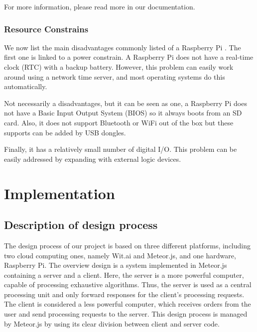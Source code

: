 For more information, please read more in our documentation.

\subsubsection{Resource Constrains}

We now list the main disadvantages commonly listed of a Raspberry Pi \cite{vujovic2014raspberry}.
The first one is linked to a power constrain.
A Raspberry Pi does not have a real-time clock (RTC) with a backup battery.
However, this problem can easily work around using a network time server, and most operating systems do this automatically.

Not necessarily a disadvantages, but it can be seen as one, a Raspberry Pi does not have a Basic Input Output System (BIOS) so it always boots from an SD card.
Also, it does not support Bluetooth or WiFi out of the box but these supports can be added by USB dongles.

Finally, it has a relatively small number of digital I/O.
This problem can be easily addressed by expanding with external logic devices.

\section{Implementation}



\subsection{Description of design process}

The design process of our project is based on three different platforms, including two cloud computing ones, namely Wit.ai and Meteor.js, and one hardware, Raspberry Pi.
The overview design is a system implemented in Meteor.js containing a server and a client.
Here, the server is a more powerful computer, capable of processing exhaustive algorithms.
Thus, the server is used as a central processing unit and only forward responses for the client's processing requests.
The client is considered a less powerful computer, which receives orders from the user and send processing requests to the server.
This design process is managed by Meteor.js by using its clear division between client and server code.

